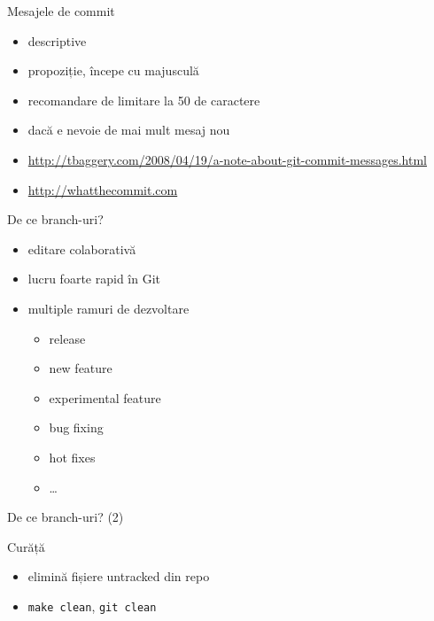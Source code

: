 \documentclass{beamer}
\begin{document}
\begin{frame}{Mesajele de commit}
  \begin{itemize}
    \item descriptive
    \item propoziție, începe cu majusculă
    \item recomandare de limitare la 50 de caractere
    \item dacă e nevoie de mai mult mesaj nou
    \scriptsize
    \item
      \url{http://tbaggery.com/2008/04/19/a-note-about-git-commit-messages.html}
    \normalsize
    \item \url{http://whatthecommit.com}
  \end{itemize}
\end{frame}

\begin{frame}{De ce branch-uri?}
  \begin{itemize}
    \item editare colaborativă
    \item lucru foarte rapid în Git
    \item multiple ramuri de dezvoltare
      \begin{itemize}
        \item release
        \item new feature
        \item experimental feature
        \item bug fixing
        \item hot fixes
        \item \ldots
      \end{itemize}
  \end{itemize}
\end{frame}

\begin{frame}{De ce branch-uri? (2)}
  \begin{center}
\end{center}
\end{frame}

\begin{frame}{Curăță}
  \begin{itemize}
    \item elimină fișiere untracked din repo
    \item \texttt{make clean}, \texttt{git clean}
  \end{itemize}
\end{frame}
\end{document}
